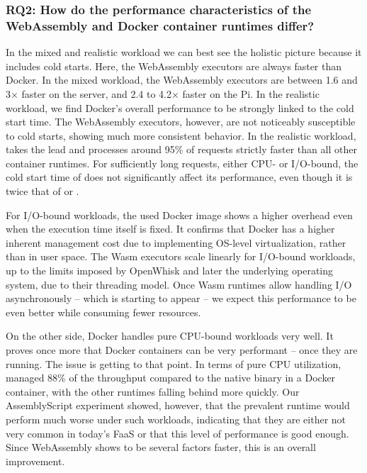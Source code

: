 \subsubsection*{RQ2: How do the performance characteristics of the WebAssembly and Docker container runtimes differ?}

In the mixed and realistic workload we can best see the holistic picture because it includes cold starts. Here, the WebAssembly executors are always faster than Docker. In the mixed workload, the WebAssembly executors are between 1.6 and 3$\times$ faster on the server, and 2.4 to 4.2$\times$ faster on the Pi. In the realistic workload, we find Docker's overall performance to be strongly linked to the cold start time. The WebAssembly executors, however, are not noticeably susceptible to cold starts, showing much more consistent behavior. In the realistic workload,  takes the lead and processes around 95\% of requests strictly faster than all other container runtimes. For sufficiently long requests, either CPU- or I/O-bound, the cold start time of  does not significantly affect its performance, even though it is twice that of  or .

For I/O-bound workloads, the used Docker image shows a higher overhead even when the execution time itself is fixed. It confirms that Docker has a higher inherent management cost due to implementing OS-level virtualization, rather than in user space.
The Wasm executors scale linearly for I/O-bound workloads, up to the limits imposed by OpenWhisk and later the underlying operating system, due to their threading model. Once Wasm runtimes allow handling I/O asynchronously -- which is starting to appear -- we expect this performance to be even better while consuming fewer resources.

On the other side, Docker handles pure CPU-bound workloads very well. It proves once more that Docker containers can be very performant -- once they are running. The issue is getting to that point.
In terms of pure CPU utilization,  managed 88\% of the throughput compared to the native binary in a Docker container, with the other runtimes falling behind more quickly. Our AssemblyScript experiment showed, however, that the prevalent  runtime would perform much worse under such workloads, indicating that they are either not very common in today's FaaS or that this level of performance is good enough. Since WebAssembly shows to be several factors faster, this is an overall improvement.


